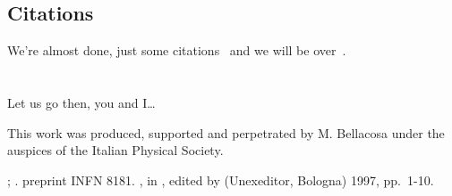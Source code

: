 \documentclass{subnucbo}
\begin{document}
\subsection{Citations}
We're almost done, just some citations~\cite{ref:apo}
and we will be over~\cite{ref:pul,ref:bra}.


\appendix

\section{}
Let us go then, you and I\ldots

\acknowledgments
This work was produced, supported and perpetrated by M. Bellacosa under
the auspices of the Italian Physical Society.

\begin{thebibliography}{0}
 
  ;
  .
 
  preprint INFN 8181.
 
  ,
  in ,
                  edited by 
                  (Unexeditor, Bologna) 1997, pp.~1-10.
\end{thebibliography}
\end{document}
